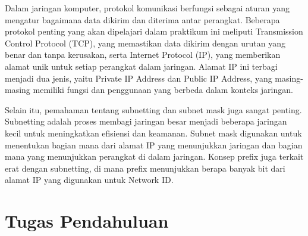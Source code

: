 Dalam jaringan komputer, protokol komunikasi berfungsi sebagai aturan yang mengatur bagaimana data dikirim dan diterima antar perangkat. Beberapa protokol penting yang akan dipelajari dalam praktikum ini meliputi Transmission Control Protocol (TCP), yang memastikan data dikirim dengan urutan yang benar dan tanpa kerusakan, serta Internet Protocol (IP), yang memberikan alamat unik untuk setiap perangkat dalam jaringan. Alamat IP ini terbagi menjadi dua jenis, yaitu Private IP Address dan Public IP Address, yang masing-masing memiliki fungsi dan penggunaan yang berbeda dalam konteks jaringan.

Selain itu, pemahaman tentang subnetting dan subnet mask juga sangat penting. Subnetting adalah proses membagi jaringan besar menjadi beberapa jaringan kecil untuk meningkatkan efisiensi dan keamanan. Subnet mask digunakan untuk menentukan bagian mana dari alamat IP yang menunjukkan jaringan dan bagian mana yang menunjukkan perangkat di dalam jaringan. Konsep prefix juga terkait erat dengan subnetting, di mana prefix menunjukkan berapa banyak bit dari alamat IP yang digunakan untuk Network ID.

\section{Tugas Pendahuluan}


